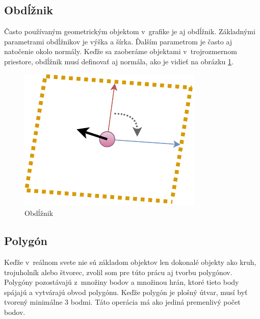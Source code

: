 \subsection*{Obdĺžnik}
Často používaným geometrickým objektom v~grafike je aj obdĺžnik. Základnými parametrami obdĺžnikov je výška a šírka. Ďalším parametrom je často aj natočenie okolo normály. Keďže sa zaoberáme objektami v~trojrozmernom priestore, obdĺžnik musí definovať aj normála, ako je vidieť na obrázku \ref{fig:SurfaceCreate Rectangle}. 


\begin{figure}[H]
	\centering

	\includegraphics[height=0.3\textwidth]{obrazky-figures/Diagram/Draw/3Plane/DP Navrh operacii-2D - SurfaceCreate Rectangle.pdf}
	\caption{Obdĺžnik}
	\label{fig:SurfaceCreate Rectangle}
\end{figure}



\subsection*{Polygón}
Keďže v~reálnom svete nie sú základom objektov len dokonalé objekty ako kruh, trojuholník alebo štvorec, zvolil som pre túto prácu aj tvorbu polygónov. Polygóny pozostávajú z~množiny bodov a množinou hrán, ktoré tieto body spájajú a vytvárajú obvod polygónu. Keďže polygón je plošný útvar, musí byť tvorený minimálne 3 bodmi. Táto operácia má ako jediná premenlivý počet bodov. 

